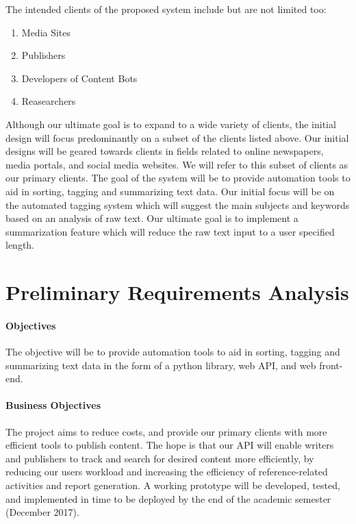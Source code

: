 \documentclass[12pt]{article}
\begin{document}
The intended clients of the proposed system include but are not limited too:
\begin{enumerate}
	\item Media Sites
	\item Publishers
	\item Developers of Content Bots
	\item Reasearchers
\end{enumerate}

Although our ultimate goal is to expand to a wide variety of clients, the initial design will focus predominantly on a subset of the clients listed above. Our initial designs will be geared towards clients in fields related to online newspapers, media portals, and social media websites. We will refer to this subset of clients as our primary clients. The goal of the system will be to provide automation tools to aid in sorting, tagging and summarizing text data. Our initial focus will be on the automated tagging system which will suggest the main subjects and keywords based on an analysis of raw text. Our ultimate goal is to implement a summarization feature which will reduce the raw text input to a user specified length.

%
%

\section{Preliminary Requirements Analysis}

\paragraph{Objectives}
The objective will be to provide automation tools to aid in sorting, tagging and summarizing text data in the form of a python library, web API, and web front-end.

\paragraph{Business Objectives}
The project aims to reduce costs, and provide our primary clients with more efficient tools to publish content. The hope is that our API will enable writers and publishers to track and search for desired content more efficiently, by reducing our users workload and increasing the efficiency of reference-related activities and report generation. A working prototype will be developed, tested, and implemented in time to be deployed by the end of the academic semester (December 2017).
\end{document}

